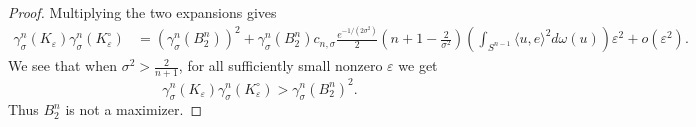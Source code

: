 \documentclass[10pt,a4paper]{amsart}
\newcommand{\eps}{\varepsilon}
\begin{document}
\begin{proof}
Multiplying the two expansions gives
\[
\begin{aligned}
        \gamma_\sigma^n(K_\eps)
        \gamma_\sigma^n(K_\eps^\circ)
        &=
        (\gamma_\sigma^n(B_2^n))^2
        +
        \gamma_\sigma^n(B_2^n) c_{n,\sigma}\frac{ e^{-1/(2\sigma^2)}}{2}
        \left(n+1-\frac2{\sigma^2}\right)
        \left(\int_{  S^{n-1}}\langle u,e\rangle^2 d\omega(u)\right)\eps^2
        +
        o(\eps^2).
\end{aligned}
\]
We see that when $\sigma^2>\frac{2}{n+1}$, for all sufficiently small nonzero \(\eps\) we get
\[
        \gamma_\sigma^n(K_\eps)\gamma_\sigma^n(K_\eps^\circ)
        >
        \gamma_\sigma^n(B_2^n)^2 .
\]
Thus \(B_2^n\) is not a maximizer.
\end{proof}
\end{document}

